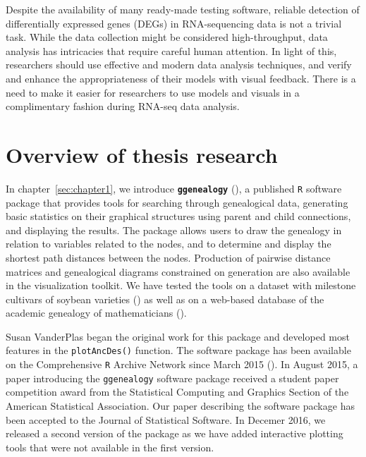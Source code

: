 \documentclass[11pt,a4paper,oldfontcommands,openany]{memoir}
\numberwithin{equation}{section} %
\newcommand{\code}[1]{{\texttt{#1}}}
\newcommand{\pkg}[1]{{\texttt{#1}}}
\begin{document}
Despite the availability of many ready-made testing software, reliable detection of differentially expressed genes (DEGs) in RNA-sequencing data is not a trivial task. While the data collection might be considered high-throughput, data analysis has intricacies that require careful human attention. In light of this, researchers should use effective and modern data analysis techniques, and verify and enhance the appropriateness of their models with visual feedback. There is a need to make it easier for researchers to use models and visuals in a complimentary fashion during RNA-seq data analysis.

\section{Overview of thesis research}


In chapter~\ref{sec:chapter1}, we introduce \textbf{\pkg{ggenealogy}} (\citealt{ggen}), a published \pkg{R} software package that provides tools for searching through genealogical data, generating basic statistics on their graphical structures using parent and child connections, and displaying the results. The package allows users to draw the genealogy in relation to variables related to the nodes, and to determine and display the shortest path distances between the nodes. Production of pairwise distance matrices and genealogical diagrams constrained on generation are also available in the visualization toolkit. We have tested the tools on a dataset with milestone cultivars of soybean varieties (\citealt{soybean}) as well as on a web-based database of the academic genealogy of mathematicians (\citealt{mgp}).

Susan VanderPlas began the original work for this package and developed most features in the \code{plotAncDes()} function. The software package has been available on the Comprehensive \pkg{R} Archive Network since March 2015 (\citealt{ggen}). In August 2015, a paper introducing the \pkg{ggenealogy} software package received a student paper competition award from the Statistical Computing and Graphics Section of the American Statistical Association. Our paper describing the software package has been accepted to the Journal of Statistical Software. In Decemer 2016, we released a second version of the package as we have added interactive plotting tools that were not available in the first version.
\end{document}
